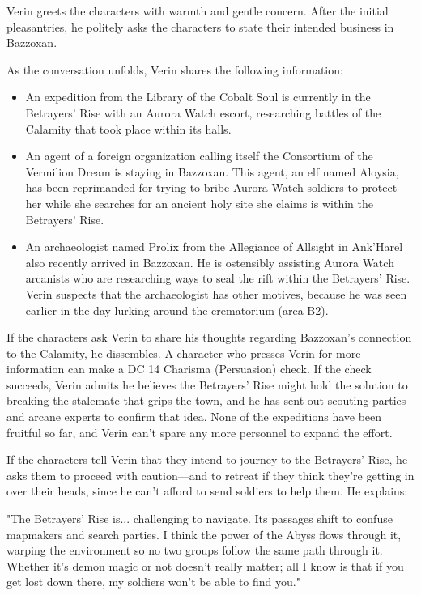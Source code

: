 \documentclass[letterpaper, 11pt, bg=full, twocolumn]{dndbook}
\begin{document}
Verin greets the characters with warmth and gentle concern. After the initial pleasantries, he politely asks the characters to state their intended business in Bazzoxan.

As the conversation unfolds, Verin shares the following information:

\begin{itemize}
\item An expedition from the Library of the Cobalt Soul is currently in the Betrayers' Rise with an Aurora Watch escort, researching battles of the Calamity that took place within its halls.
\item An agent of a foreign organization calling itself the Consortium of the Vermilion Dream is staying in Bazzoxan. This agent, an elf named Aloysia, has been reprimanded for trying to bribe Aurora Watch soldiers to protect her while she searches for an ancient holy site she claims is within the Betrayers' Rise.
\item An archaeologist named Prolix from the Allegiance of Allsight in Ank'Harel also recently arrived in Bazzoxan. He is ostensibly assisting Aurora Watch arcanists who are researching ways to seal the rift within the Betrayers' Rise. Verin suspects that the archaeologist has other motives, because he was seen earlier in the day lurking around the crematorium (area B2).
\end{itemize}

If the characters ask Verin to share his thoughts regarding Bazzoxan's connection to the Calamity, he dissembles. A character who presses Verin for more information can make a DC 14 Charisma (Persuasion) check. If the check succeeds, Verin admits he believes the Betrayers' Rise might hold the solution to breaking the stalemate that grips the town, and he has sent out scouting parties and arcane experts to confirm that idea. None of the expeditions have been fruitful so far, and Verin can't spare any more personnel to expand the effort.

If the characters tell Verin that they intend to journey to the Betrayers' Rise, he asks them to proceed with caution---and to retreat if they think they're getting in over their heads, since he can't afford to send soldiers to help them. He explains:

\begin{DndReadAloud}
"The Betrayers' Rise is... challenging to navigate. Its passages shift to confuse mapmakers and search parties. I think the power of the Abyss flows through it, warping the environment so no two groups follow the same path through it. Whether it's demon magic or not doesn't really matter; all I know is that if you get lost down there, my soldiers won't be able to find you."
\end{DndReadAloud}
\end{document}

